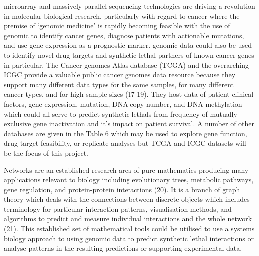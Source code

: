 \Gls{microarray} and massively-parallel sequencing technologies are driving a revolution in molecular biological research, particularly with regard to cancer where the premise of ‘genomic medicine’ is rapidly becoming feasible with the use of \gls{genomic} to identify \glspl{cancer gene}, diagnose patients with actionable \glspl{mutation}, and use \gls{gene expression} as a prognostic marker. \Gls{genomic} data could also be used to identify novel drug targets and \gls{synthetic lethal} partners of known cancer genes in particular. The Cancer \Glspl{genome} Atlas database (\gls{TCGA}) and the overarching \gls{ICGC} provide a valuable public cancer \glspl{genome} data resource because they support many different data types for the same samples, for many different cancer types, and for high sample sizes (17-19). They host data of patient clinical factors, \gls{gene expression},  \gls{mutation}, \acrshort{DNA} copy number, and \acrshort{DNA} methylation which could all serve to predict \glspl{synthetic lethal} from frequency of mutually exclusive gene inactivation and it’s impact on patient survival. A number of other databases are given in the Table 6 which may be used to explore gene function, drug target feasibility, or replicate analyses but \gls{TCGA} and \gls{ICGC} datasets will be the focus of this project.

Networks are an established research area of pure mathematics producing many applications relevant to biology including evolutionary trees, metabolic pathways, gene regulation, and protein-protein interactions (20). It is a branch of graph theory which deals with the connections between discrete objects which includes terminology for particular interaction patterns, visualisation methods, and algorithms to predict and measure individual interactions and the whole network (21). This established set of mathematical tools could be utilised to use a systems biology approach to using \gls{genomic} data to predict \gls{synthetic lethal} interactions or analyse patterns in the resulting predictions or supporting experimental data.


